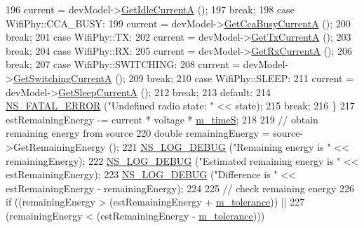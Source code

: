 \begin{DoxyCode}
196       current = devModel->\hyperlink{classns3_1_1WifiRadioEnergyModel_a50648b907f718a5dce9f3c390dcae9ca}{GetIdleCurrentA} ();
197       \textcolor{keywordflow}{break};
198     \textcolor{keywordflow}{case} WifiPhy::CCA\_BUSY:
199       current = devModel->\hyperlink{classns3_1_1WifiRadioEnergyModel_a3f4f6e6e4811c7d58b0175e5e7abf9f9}{GetCcaBusyCurrentA} ();
200       \textcolor{keywordflow}{break};
201     \textcolor{keywordflow}{case} WifiPhy::TX:
202       current = devModel->\hyperlink{classns3_1_1WifiRadioEnergyModel_acd12496e021e0d8a096b61a6b2e5263c}{GetTxCurrentA} ();
203       \textcolor{keywordflow}{break};
204     \textcolor{keywordflow}{case} WifiPhy::RX:
205       current = devModel->\hyperlink{classns3_1_1WifiRadioEnergyModel_a720fcc160a64f12da94efab74fcebf81}{GetRxCurrentA} ();
206       \textcolor{keywordflow}{break};
207     \textcolor{keywordflow}{case} WifiPhy::SWITCHING:
208       current = devModel->\hyperlink{classns3_1_1WifiRadioEnergyModel_a616decc2a1cc0d9f97564ac647282638}{GetSwitchingCurrentA} ();
209       \textcolor{keywordflow}{break};
210     \textcolor{keywordflow}{case} WifiPhy::SLEEP:
211       current = devModel->\hyperlink{classns3_1_1WifiRadioEnergyModel_a4b2c29b0645c30020d6fe88332a719c3}{GetSleepCurrentA} ();
212       \textcolor{keywordflow}{break};
213     \textcolor{keywordflow}{default}:
214       \hyperlink{group__fatal_ga5131d5e3f75d7d4cbfd706ac456fdc85}{NS\_FATAL\_ERROR} (\textcolor{stringliteral}{"Undefined radio state: "} << state);
215       \textcolor{keywordflow}{break};
216     \}
217   estRemainingEnergy -= current * voltage * \hyperlink{classBasicEnergyUpdateTest_a4db29015c7b28c1b861621098e79cfe5}{m\_timeS};
218 
219   \textcolor{comment}{// obtain remaining energy from source}
220   \textcolor{keywordtype}{double} remainingEnergy = source->GetRemainingEnergy ();
221   \hyperlink{group__logging_ga413f1886406d49f59a6a0a89b77b4d0a}{NS\_LOG\_DEBUG} (\textcolor{stringliteral}{"Remaining energy is "} << remainingEnergy);
222   \hyperlink{group__logging_ga413f1886406d49f59a6a0a89b77b4d0a}{NS\_LOG\_DEBUG} (\textcolor{stringliteral}{"Estimated remaining energy is "} << estRemainingEnergy);
223   \hyperlink{group__logging_ga413f1886406d49f59a6a0a89b77b4d0a}{NS\_LOG\_DEBUG} (\textcolor{stringliteral}{"Difference is "} << estRemainingEnergy - remainingEnergy);
224 
225   \textcolor{comment}{// check remaining energy}
226   \textcolor{keywordflow}{if} ((remainingEnergy > (estRemainingEnergy + \hyperlink{classBasicEnergyUpdateTest_af476a051fd73ccab6996bd516fd4746b}{m\_tolerance})) ||
227       (remainingEnergy < (estRemainingEnergy - \hyperlink{classBasicEnergyUpdateTest_af476a051fd73ccab6996bd516fd4746b}{m\_tolerance})))

\end{DoxyCode}
